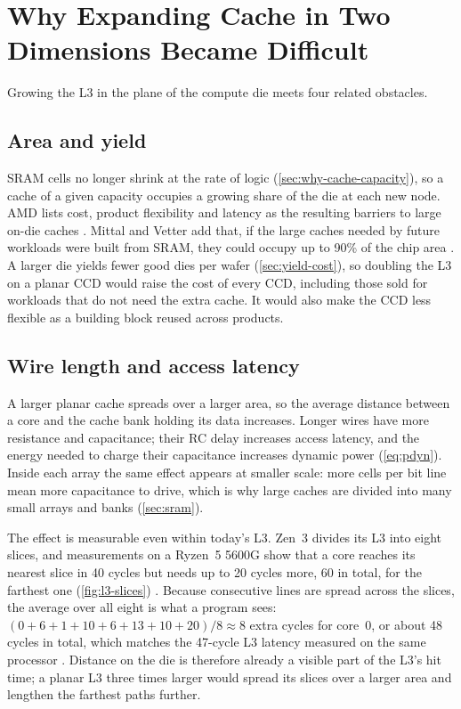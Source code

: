 \section{Why Expanding Cache in Two Dimensions Became Difficult}
\label{sec:planar-limits}

Growing the L3 in the plane of the compute die meets four related obstacles.

\subsection{Area and yield}
SRAM cells no longer shrink at the rate of logic (\cref{sec:why-cache-capacity}), so a cache of a given capacity occupies a growing share of the die at each new node. AMD lists cost, product flexibility and latency as the resulting barriers to large on-die caches \cite[slide~6]{wuu2022vcache}. Mittal and Vetter add that, if the large caches needed by future workloads were built from SRAM, they could occupy up to 90\% of the chip area \cite[sec.~1]{mittalSurveyTechniquesArchitecting2016}. A larger die yields fewer good dies per wafer (\cref{sec:yield-cost}), so doubling the L3 on a planar CCD would raise the cost of every CCD, including those sold for workloads that do not need the extra cache. It would also make the CCD less flexible as a building block reused across products.

\subsection{Wire length and access latency}
A larger planar cache spreads over a larger area, so the average distance between a core and the cache bank holding its data increases. Longer wires have more resistance and capacitance; their RC delay increases access latency, and the energy needed to charge their capacitance increases dynamic power (\cref{eq:pdyn}). Inside each array the same effect appears at smaller scale: more cells per bit line mean more capacitance to drive, which is why large caches are divided into many small arrays and banks (\cref{sec:sram}).

The effect is measurable even within today's L3. Zen~3 divides its L3 into eight slices, and measurements on a Ryzen~5 5600G show that a core reaches its nearest slice in 40 cycles but needs up to 20 cycles more, 60 in total, for the farthest one (\cref{fig:l3-slices}) \cite{7-cpu.comAMDZen3}. Because consecutive lines are spread across the slices, the average over all eight is what a program sees: $(0+6+1+10+6+13+10+20)/8 \approx 8$ extra cycles for core~0, or about 48 cycles in total, which matches the 47-cycle L3 latency measured on the same processor \cite{7-cpu.comAMDZen3}. Distance on the die is therefore already a visible part of the L3's hit time; a planar L3 three times larger would spread its slices over a larger area and lengthen the farthest paths further.

